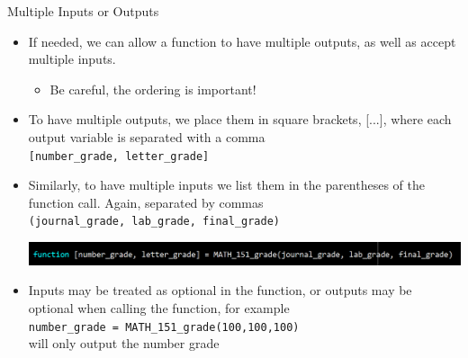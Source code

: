 {}\documentclass[letterpaper,
compress,
xcolor=x11names,
]{beamer}
\begin{document}

\begin{frame}{Multiple Inputs or Outputs}
	\footnotesize
	\begin{itemize}
		\item If needed, we can allow a function to have multiple outputs, as well as accept multiple inputs.
		\begin{itemize}
			\item Be careful, the ordering is important!
		\end{itemize}
		\item<2-> To have multiple outputs, we place them in square brackets, [...], where each output variable is separated with a comma \\
		\hspace{0.5cm}\texttt{[number\_grade, letter\_grade]}
		\item<3-> Similarly, to have multiple inputs we list them in the parentheses of the function call. Again, separated by commas\\
		\hspace{0.5cm}\texttt{(journal\_grade, lab\_grade, final\_grade)}
		\begin{center}
			\includegraphics[width = \linewidth]{multiple_IO.png}
		\end{center}
		\item<4-> Inputs may be treated as optional in the function, or outputs may be optional when calling the function, for example \\
		\hspace{0.5cm}\texttt{number\_grade = MATH\_151\_grade(100,100,100)} \\
		will only output the number grade
		
	\end{itemize}
\end{frame}

\end{document}
